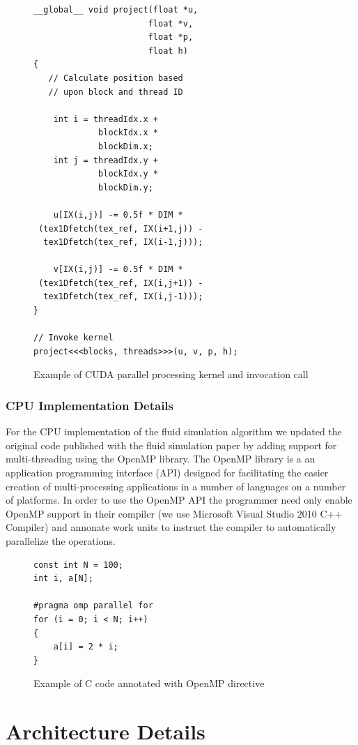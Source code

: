\documentclass[conference]{IEEEtran}
\begin{document}
\begin{figure}
\begin{verbatim}
__global__ void project(float *u,
                       float *v,
                       float *p,
                       float h) 
{
   // Calculate position based
   // upon block and thread ID

    int i = threadIdx.x + 
             blockIdx.x * 
             blockDim.x;
    int j = threadIdx.y + 
             blockIdx.y *
             blockDim.y;

    u[IX(i,j)] -= 0.5f * DIM *
 (tex1Dfetch(tex_ref, IX(i+1,j)) -
  tex1Dfetch(tex_ref, IX(i-1,j)));
	
    v[IX(i,j)] -= 0.5f * DIM *
 (tex1Dfetch(tex_ref, IX(i,j+1)) - 
  tex1Dfetch(tex_ref, IX(i,j-1)));
}

// Invoke kernel
project<<<blocks, threads>>>(u, v, p, h);
\end{verbatim}
\caption{Example of CUDA parallel processing kernel and invocation call}
\end{figure}

\subsubsection{CPU Implementation Details}

For the CPU implementation of the fluid simulation algorithm we updated the original code published with the fluid simulation paper by adding support for multi-threading using the OpenMP library. The OpenMP library is a an application programming interface (API) designed for facilitating the easier creation of multi-processing applications in a number of languages on a number of platforms. In order to use the OpenMP API the programmer need only enable OpenMP support in their compiler (we use Microsoft Visual Studio 2010 C++ Compiler) and annonate work units to instruct the compiler to automatically parallelize the operations.

\begin{figure}
\begin{verbatim}
const int N = 100;
int i, a[N];

#pragma omp parallel for
for (i = 0; i < N; i++)
{
    a[i] = 2 * i;
}
\end{verbatim}
\caption{Example of C code annotated with OpenMP directive}
\end{figure}

\section{Architecture Details}
\end{document}
